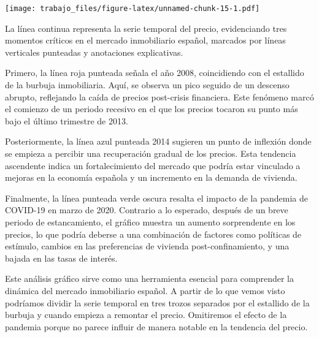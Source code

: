 \documentclass[
]{article}
\newenvironment{Shaded}{\begin{snugshade}}{\end{snugshade}}
\newcommand{\AttributeTok}[1]{\textcolor[rgb]{0.77,0.63,0.00}{#1}}
\newcommand{\CommentTok}[1]{\textcolor[rgb]{0.56,0.35,0.01}{\textit{#1}}}
\newcommand{\DecValTok}[1]{\textcolor[rgb]{0.00,0.00,0.81}{#1}}
\newcommand{\FloatTok}[1]{\textcolor[rgb]{0.00,0.00,0.81}{#1}}
\newcommand{\FunctionTok}[1]{\textcolor[rgb]{0.00,0.00,0.00}{#1}}
\newcommand{\NormalTok}[1]{#1}
\newcommand{\SpecialCharTok}[1]{\textcolor[rgb]{0.00,0.00,0.00}{#1}}
\newcommand{\StringTok}[1]{\textcolor[rgb]{0.31,0.60,0.02}{#1}}
\begin{document}
\begin{Shaded}
\end{Shaded}

\texttt{[image: trabajo\_files/figure-latex/unnamed-chunk-15-1.pdf]}

La línea continua representa la serie temporal del precio, evidenciando
tres momentos críticos en el mercado inmobiliario español, marcados por
líneas verticales punteadas y anotaciones explicativas.

Primero, la línea roja punteada señala el año 2008, coincidiendo con el
estallido de la burbuja inmobiliaria. Aquí, se observa un pico seguido
de un descenso abrupto, reflejando la caída de precios post-crisis
financiera. Este fenómeno marcó el comienzo de un periodo recesivo en el
que los precios tocaron su punto más bajo el último trimestre de 2013.

Posteriormente, la línea azul punteada 2014 sugieren un punto de
inflexión donde se empieza a percibir una recuperación gradual de los
precios. Esta tendencia ascendente indica un fortalecimiento del mercado
que podría estar vinculado a mejoras en la economía española y un
incremento en la demanda de vivienda.

Finalmente, la línea punteada verde oscura resalta el impacto de la
pandemia de COVID-19 en marzo de 2020. Contrario a lo esperado, después
de un breve periodo de estancamiento, el gráfico muestra un aumento
sorprendente en los precios, lo que podría deberse a una combinación de
factores como políticas de estímulo, cambios en las preferencias de
vivienda post-confinamiento, y una bajada en las tasas de interés.

Este análisis gráfico sirve como una herramienta esencial para
comprender la dinámica del mercado inmobiliario español. A partir de lo
que vemos visto podríamos dividir la serie temporal en tres trozos
separados por el estallido de la burbuja y cuando empieza a remontar el
precio. Omitiremos el efecto de la pandemia porque no parece influir de
manera notable en la tendencia del precio.
\end{document}
